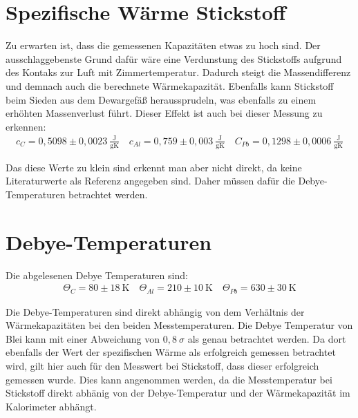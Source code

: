 \section{Spezifische Wärme Stickstoff}
Zu erwarten ist, dass die gemessenen Kapazitäten etwas zu hoch sind.
Der ausschlaggebenste Grund dafür wäre eine Verdunstung des Stickstoffs aufgrund des Kontaks zur Luft mit Zimmertemperatur.
Dadurch steigt die Massendifferenz und demnach auch die berechnete Wärmekapazität. Ebenfalls kann Stickstoff beim Sieden aus dem Dewargefäß heraussprudeln,
was ebenfalls zu einem erhöhten Massenverlust führt.
Dieser Effekt ist auch bei dieser Messung zu erkennen:
\begin{align}
    \boxed{c_C = 0,5098 \pm 0,0023 \ \tfrac{\text{J}}{\text{gK}} \quad c_{Al} = 0,759 \pm 0,003 \ \tfrac{\text{J}}{\text{gK}} \quad C_{Pb} = 0,1298 \pm 0,0006 \ \tfrac{\text{J}}{\text{gK}}}
\end{align}

Das diese Werte zu klein sind erkennt man aber nicht direkt, da keine Literaturwerte als Referenz angegeben sind.
Daher müssen dafür die Debye-Temperaturen betrachtet werden.

\section{Debye-Temperaturen}
Die abgelesenen Debye Temperaturen sind:
\begin{align}
    \boxed{\Theta_{C} = 80 \pm 18 \ \text{K} \quad \Theta_{Al} = 210 \pm 10 \ \text{K} \quad \Theta_{Pb} = 630 \pm 30 \ \text{K}}
\end{align}

Die Debye-Temperaturen sind direkt abhängig von dem Verhältnis der Wärmekapazitäten bei den beiden Messtemperaturen.
Die Debye Temperatur von Blei kann mit einer Abweichung von $0,8 \ \sigma$ als genau betrachtet werden. Da dort ebenfalls der Wert der spezifischen Wärme
als erfolgreich gemessen betrachtet wird, gilt hier auch für den Messwert bei Stickstoff, dass dieser erfolgreich gemessen wurde.
Dies kann angenommen werden, da die Messtemperatur bei Stickstoff direkt abhänig von der Debye-Temperatur und der Wärmekapazität im Kalorimeter abhängt.\\


